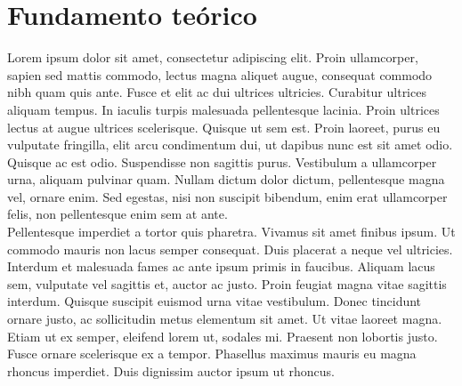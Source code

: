 \documentclass[letterpaper,oneside,openany,11pt]{book}
\begin{document}


\chapter{Fundamento  teórico}\label{cap.marco}
\noindent Lorem ipsum dolor sit amet, consectetur adipiscing elit. Proin ullamcorper, sapien sed mattis commodo, lectus magna aliquet augue, consequat commodo nibh quam quis ante. Fusce et elit ac dui ultrices ultricies. Curabitur ultrices aliquam tempus. In iaculis turpis malesuada pellentesque lacinia. Proin ultrices lectus at augue ultrices scelerisque. Quisque ut sem est. Proin laoreet, purus eu vulputate fringilla, elit arcu condimentum dui, ut dapibus nunc est sit amet odio. Quisque ac est odio. Suspendisse non sagittis purus. Vestibulum a ullamcorper urna, aliquam pulvinar quam. Nullam dictum dolor dictum, pellentesque magna vel, ornare enim. Sed egestas, nisi non suscipit bibendum, enim erat ullamcorper felis, non pellentesque enim sem at ante. \\

Pellentesque imperdiet a tortor quis pharetra. Vivamus sit amet finibus ipsum. Ut commodo mauris non lacus semper consequat. Duis placerat a neque vel ultricies. Interdum et malesuada fames ac ante ipsum primis in faucibus. Aliquam lacus sem, vulputate vel sagittis et, auctor ac justo. Proin feugiat magna vitae sagittis interdum. Quisque suscipit euismod urna vitae vestibulum. Donec tincidunt ornare justo, ac sollicitudin metus elementum sit amet. Ut vitae laoreet magna. Etiam ut ex semper, eleifend lorem ut, sodales mi. Praesent non lobortis justo. Fusce ornare scelerisque ex a tempor. Phasellus maximus mauris eu magna rhoncus imperdiet. Duis dignissim auctor ipsum ut rhoncus. \\



\end{document}
